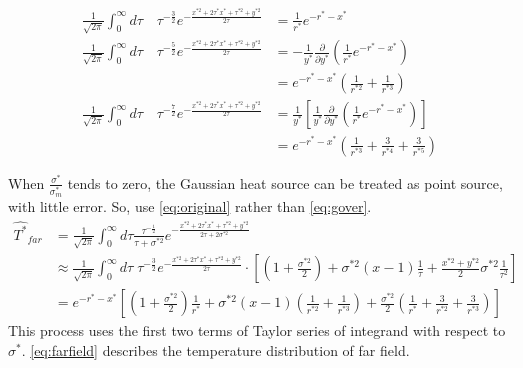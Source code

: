 \documentclass[review, 1p, number, sort&compress,table]{elsarticle}
\begin{document}
		\begin{align}
		\frac{1}{\sqrt{2\pi}}\int_{0}^{\infty}{d\tau}\quad \tau^{-\frac{3}{2}}e^{-\frac{x^{*2}+2\tau^*x^{*}+\tau^{*2}+y^{*2}}{2\tau}} &= \frac{1}{r^{*}}e^{-r^{*}-x^{*}} \label{eq:gauss v point 1}
		\\ \nonumber
		\frac{1}{\sqrt{2\pi}}\int_{0}^{\infty}{d\tau}\quad \tau^{-\frac{5}{2}}e^{-\frac{x^{*2}+2\tau^*x^{*}+\tau^{*2}+y^{*2}}{2\tau}} &= -\frac{1}{y^{*}}  \frac{\partial}{\partial y^{*}}\left(\frac{1}{r^{*}}e^{-r^{*}-x^{*}}\right)
		\\
		&=e^{-r^{*}-x^{*}}\left(\frac{1}{r^{*2}}+\frac{1}{r^{*3}}\right)  \label{eq:gauss v point 2}
		\\ \nonumber
		\frac{1}{\sqrt{2\pi}}\int_{0}^{\infty}{d\tau}\quad \tau^{-\frac{7}{2}}e^{-\frac{x^{*2}+2\tau^*x^{*}+\tau^{*2}+y^{*2}}{2\tau}} &=\frac{1}{y^{*}}  \left[\frac{1}{y^{*}}  \frac{\partial}{\partial y^{*}}\left(\frac{1}{r^{*}}e^{-r^{*}-x^{*}}\right)\right] 
		\\
		&=e^{-r^{*}-x^{*}}\left(\frac{1}{r^{*3}}+\frac{3}{r^{*4}} +\frac{3}{r^{*5}}\right) \label{eq:gauss v point 3}
		\end{align}\label{eq:gauss v point}
		
	When $\frac{\sigma^{*}}{\sigma^{*}_m}$ tends to zero, the Gaussian heat source can be treated as point source, with little error. So, use \autoref{eq:original} rather than \autoref{eq:gover}.
		\begin{align}  \label{eq:farfield}
			\nonumber
		\widehat{T^*}_{far}&=\frac{1}{\sqrt{2\pi}}\int_{0}^{\infty}{d\tau}\frac{\tau^{-\frac{1}{2}}}{\tau+\sigma^{*2}}e^{-\frac{x^{*2}+2\tau^*x^{*}+\tau^{*2}+y^{*2}}{2\tau+2\sigma^{*2}}}
		\\ \nonumber
		&\approx \frac{1}{\sqrt{2\pi}}\int_{0}^{\infty}{d\tau}\;{\tau^{-\frac{3}{2}}}e^{-\frac{x^{*2}+2\tau^*x^{*}+\tau^{*2}+y^{*2}}{2\tau}} \cdot \left[ \left(1+\frac{\sigma^{*2}}{2} \right)   +\sigma^{*2}\left(x-1\right)\frac{1}{\tau}   +\frac{x^{*2}+y^{*2}}{2}\sigma^{*2}\frac{1}{\tau^2}\right]
		\\ 
		&= e^{-r^{*}-x^{*}}\left[ \left(1+\frac{\sigma^{*2}}{2} \right)  \frac{1}{r^{*}} +\sigma^{*2}\left(x-1\right) \left(\frac{1}{r^{*2}}+\frac{1}{r^{*3}}\right)+\frac{\sigma^{*2}}{2}\left(\frac{1}{r^{*}}+\frac{3}{r^{*2}} +\frac{3}{r^{*3}}\right)\right]
		\end{align}
		This process uses the first two terms of Taylor series of integrand with respect to $\sigma^{*}$. \autoref{eq:farfield} describes the temperature distribution of far field.
\end{document}
